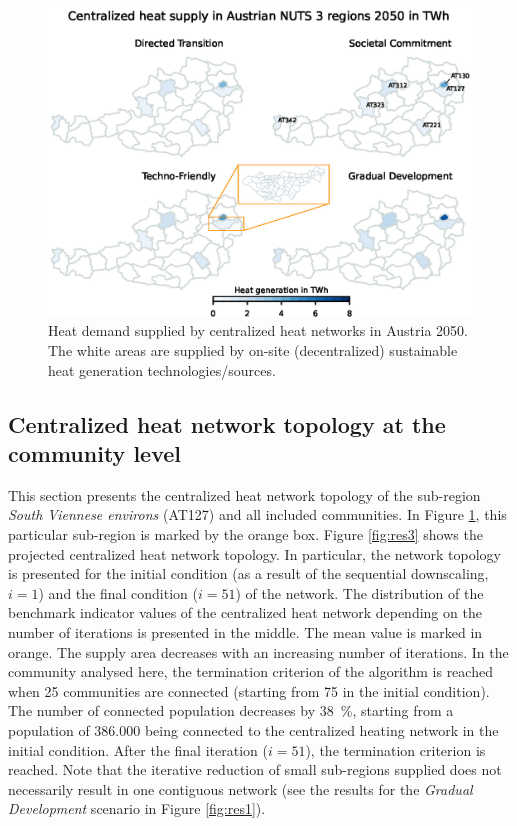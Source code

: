 \begin{figure}
	\centering
	\includegraphics[width=1\linewidth]{figures/4_Results/Heatmap.eps}
	\caption{Heat demand supplied by centralized heat networks in Austria 2050. The white areas are supplied by on-site (decentralized) sustainable heat generation technologies/sources.}
	\label{fig:res2}
\end{figure}

\subsection{Centralized heat network topology at the community level}\label{res:4}
This section presents the centralized heat network topology of the sub-region \textit{South Viennese environs} (AT127) and all included communities. In Figure \ref{fig:res2}, this particular sub-region is marked by the orange box. Figure \ref{fig:res3} shows the projected centralized heat network topology. In particular, the network topology is presented for the initial condition (as a result of the sequential downscaling, $i=1$) and the final condition ($i=51$) of the network. The distribution of the benchmark indicator values of the centralized heat network depending on the number of iterations is presented in the middle. The mean value is marked in orange. The supply area decreases with an increasing number of iterations. In the community analysed here, the termination criterion of the algorithm is reached when 25 communities are connected (starting from 75 in the initial condition). The number of connected population decreases by \SI{38}{\%}, starting from a population of \SI{386,000}{} being connected to the centralized heating network in the initial condition. After the final iteration ($i=51$), the termination criterion is reached. Note that the iterative reduction of small sub-regions supplied does not necessarily result in one contiguous network (see the results for the \textit{Gradual Development} scenario in Figure \ref{fig:res1}).

